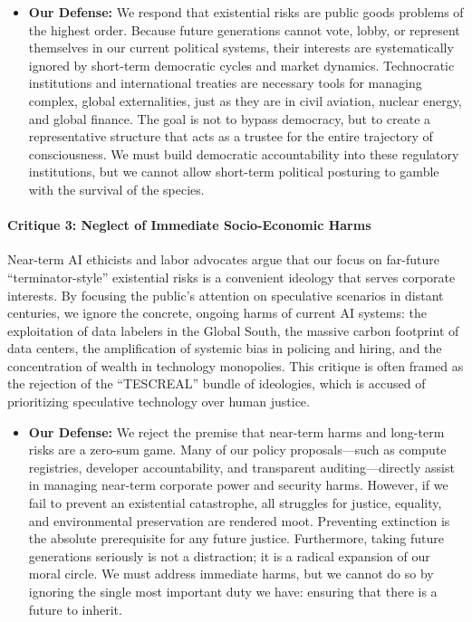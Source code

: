 \begin{itemize}
\tightlist
\item
  \textbf{Our Defense:} We respond that existential risks are public
  goods problems of the highest order. Because future generations cannot
  vote, lobby, or represent themselves in our current political systems,
  their interests are systematically ignored by short-term democratic
  cycles and market dynamics. Technocratic institutions and
  international treaties are necessary tools for managing complex,
  global externalities, just as they are in civil aviation, nuclear
  energy, and global finance. The goal is not to bypass democracy, but
  to create a representative structure that acts as a trustee for the
  entire trajectory of consciousness. We must build democratic
  accountability into these regulatory institutions, but we cannot allow
  short-term political posturing to gamble with the survival of the
  species.
\end{itemize}

\paragraph{Critique 3: Neglect of Immediate Socio-Economic
Harms}\label{critique-3-neglect-of-immediate-socio-economic-harms}

Near-term AI ethicists and labor advocates argue that our focus on
far-future ``terminator-style'' existential risks is a convenient
ideology that serves corporate interests. By focusing the public's
attention on speculative scenarios in distant centuries, we ignore the
concrete, ongoing harms of current AI systems: the exploitation of data
labelers in the Global South, the massive carbon footprint of data
centers, the amplification of systemic bias in policing and hiring, and
the concentration of wealth in technology monopolies. This critique is
often framed as the rejection of the ``TESCREAL'' bundle of ideologies,
which is accused of prioritizing speculative technology over human
justice.

\begin{itemize}
\tightlist
\item
  \textbf{Our Defense:} We reject the premise that near-term harms and
  long-term risks are a zero-sum game. Many of our policy
  proposals---such as compute registries, developer accountability, and
  transparent auditing---directly assist in managing near-term corporate
  power and security harms. However, if we fail to prevent an
  existential catastrophe, all struggles for justice, equality, and
  environmental preservation are rendered moot. Preventing extinction is
  the absolute prerequisite for any future justice. Furthermore, taking
  future generations seriously is not a distraction; it is a radical
  expansion of our moral circle. We must address immediate harms, but we
  cannot do so by ignoring the single most important duty we have:
  ensuring that there is a future to inherit.
\end{itemize}

